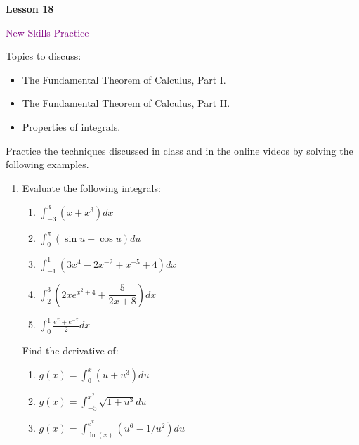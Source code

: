 \documentclass[10pt]{book}
\theoremstyle{definition}
\theoremstyle{remark}
\begin{document}
\begin{tcolorbox}[
  width=\textwidth,
  colback=gray!10, %
  colframe=white, %
  boxrule=0pt,    %
  left=1cm,       %
  right=1cm,      %
  sharp corners  %
]

\begin{minipage}[t]{0.5\textwidth}
  \Huge \textbf{Lesson 18}
\end{minipage}%
\hfill
\begin{minipage}[t]{0.5\textwidth}
  \Huge\textcolor{purple}{New Skills Practice}
\end{minipage}
\end{tcolorbox}

\begin{large}
\noindent
Topics to discuss:
\begin{itemize}
\item The Fundamental Theorem of Calculus, Part I.
\item The Fundamental Theorem of Calculus, Part II.
\item Properties of integrals. 
\end{itemize}
\newpage

\noindent
Practice the techniques discussed in class and in the online videos by solving the following examples. 
\begin{enumerate}
\item Evaluate the following integrals:
\begin{enumerate}
	\item    $\displaystyle \int_{-3}^{3} \left(x + x^3\right) dx$ \vfil\vfil
	\item    $\displaystyle \int_{0}^{\pi} \left(\sin u + \cos u\right) du$ \vfil\vfil
	\item    $\displaystyle \int_{-1}^{1} \left(3x^4 - 2x^{-2} + x^{-5} + 4\right) dx$ \vfil\vfil
	\item    $\displaystyle \int_{2}^{3} \left(2xe^{x^2 + 4} + \dfrac{5}{2x+8}  \right) dx$ \vfil\vfil
	\item    $\displaystyle \int_{0}^{1} \frac{e^x + e^{-x}}{2} dx$ \vfil
\end{enumerate} 
\newpage

Find the derivative of:
\begin{enumerate}
	\item    $g(x) = \displaystyle \int_{0}^{x} \left(u +u^3\right) du$    \vfil\vfil
	\item    $g(x) = \displaystyle \int_{-5}^{x^2} \sqrt{1 + u^3} du$    \vfil\vfil
	\item    $g(x) = \displaystyle \int_{\ln(x)}^{e^x} \left(u^6 - 1/u^2\right) du$    \vfil
\end{enumerate}
\newpage


\end{enumerate}
\end{large}
\end{document}
